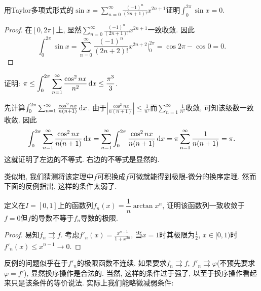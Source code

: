 \begin{example}
	用Taylor多项式形式的$\sin x = \sum_{n=0}^{\infty} \frac{(-1)^n}{(2n+1)!}x^{2n+1}$证明$\int_0^{2\pi} \sin x = 0$. 
\end{example}
\begin{proof}
	在$[0,2\pi]$上, 显然$\sum_{n=0}^{\infty} \frac{(-1)^n}{(2n+1)!}x^{2n+1}$一致收敛. 因此$$\int_0^{2\pi} \sin x = \sum_{n=0}^{\infty} \frac{(-1)^n}{(2n+2)!}x^{2n+2} \big|_0^{2\pi} = \cos 2\pi - \cos 0 = 0.$$
\end{proof}

\begin{example}
	证明: $\displaystyle \pi \leq \int_0^{2\pi} \sum_{n=1}^{\infty} \frac{\cos ^2 nx}{n^2} \mathop{}\!\mathrm{d} x \leq \frac{\pi ^3}{3}$. 
\end{example}
\begin{solution}
	先计算$\int_0^{2\pi} \sum_{n=1}^{\infty} \frac{\cos ^2 nx}{n(n+1)} \mathop{}\!\mathrm{d} x$. 由于$|\frac{\cos ^2 nx}{n(n+1)}|\leq \frac{1}{n^2}$而$\sum_{n=1}^{\infty} \frac{1}{n^2}$收敛, 可知该级数一致收敛. 因此$$\int_0^{2\pi} \sum_{n=1}^{\infty} \frac{\cos ^2 nx}{n(n+1)} \mathop{}\!\mathrm{d} x = \sum_{n=1}^{\infty} \int_0^{2\pi} \frac{\cos ^2 nx}{n(n+1)} \mathop{}\!\mathrm{d} x = \pi \sum_{n=1}^{\infty} \frac{1}{n(n+1)} = \pi.$$
	这就证明了左边的不等式. 右边的不等式是显然的. 
\end{solution}

类似地, 我们猜测将该定理中$f$可积换成$f$可微就能得到极限-微分的换序定理. 然而下面的反例指出, 这样的条件太弱了. 

\begin{example}
	定义在$I=[0,1]$上的函数列$f_n(x)=\dfrac{1}{n}\arctan x^n$, 证明该函数列一致收敛于$f=0$但$f$的导数不等于$f_n$导数的极限. 
\end{example}
\begin{proof}
	易知$f_n \rightrightarrows f$. 考虑$f'_n (x)= \frac{x^{n-1}}{1+x^{2n}}$, 当$x=1$时其极限为$\frac{1}{2}$, $x \in [0,1)$时$f'_n(x) \leq x^{n-1} \to 0$. 
\end{proof}

反例的问题似乎在于$f'_n$的极限函数不连续. 如果要求$f_n \rightrightarrows f$, $f'_n \rightrightarrows \varphi$(不预先要求$\varphi = f'$), 显然换序操作是合法的. 当然, 这样的条件过于强了, 以至于换序操作看起来只是该条件的等价说法. 实际上我们能略微减弱条件: 


